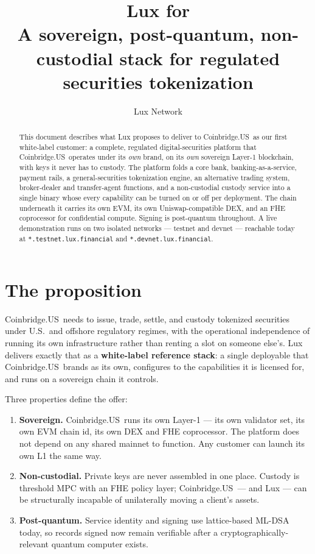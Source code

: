 \documentclass[11pt,a4paper]{article}
\title{Lux for \customer\\[4pt]
\large A sovereign, post-quantum, non-custodial stack for regulated
securities tokenization}
\author{Lux Network}
\date{}
\newcommand{\customer}{Coinbridge.US}
\begin{document}
\maketitle

\begin{abstract}
This document describes what Lux proposes to deliver to \customer\ as our
first white-label customer: a complete, regulated digital-securities
platform that \customer\ operates under its \emph{own} brand, on its
\emph{own} sovereign Layer-1 blockchain, with keys it never has to
custody. The platform folds a core bank, banking-as-a-service, payment
rails, a general-securities tokenization engine, an alternative trading
system, broker-dealer and transfer-agent functions, and a non-custodial
custody service into a single binary whose every capability can be turned
on or off per deployment. The chain underneath it carries its own EVM,
its own Uniswap-compatible DEX, and an FHE coprocessor for confidential
compute. Signing is post-quantum throughout. A live demonstration runs on
two isolated networks --- testnet and devnet --- reachable today at
\texttt{*.testnet.lux.financial} and \texttt{*.devnet.lux.financial}.
\end{abstract}

\section{The proposition}

\customer\ needs to issue, trade, settle, and custody tokenized
securities under U.S.\ and offshore regulatory regimes, with the
operational independence of running its own infrastructure rather than
renting a slot on someone else's. Lux delivers exactly that as a
\textbf{white-label reference stack}: a single deployable that \customer\
brands as its own, configures to the capabilities it is licensed for, and
runs on a sovereign chain it controls.

Three properties define the offer:

\begin{enumerate}[leftmargin=*]
  \item \textbf{Sovereign.} \customer\ runs its own Layer-1 --- its own
  validator set, its own EVM chain id, its own DEX and FHE coprocessor.
  The platform does not depend on any shared mainnet to function. Any
  customer can launch its own L1 the same way.
  \item \textbf{Non-custodial.} Private keys are never assembled in one
  place. Custody is threshold MPC with an FHE policy layer; \customer\
  --- and Lux --- can be structurally incapable of unilaterally moving a
  client's assets.
  \item \textbf{Post-quantum.} Service identity and signing use
  lattice-based ML-DSA today, so records signed now remain verifiable
  after a cryptographically-relevant quantum computer exists.
\end{enumerate}
\end{document}
